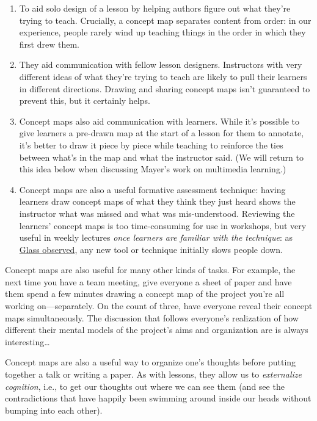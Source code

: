 \begin{enumerate}
\item To aid solo design of a lesson by helping authors figure out what they're trying to teach.
Crucially, a concept map separates content from order:
in our experience,
people rarely wind up teaching things in the order in which they first drew them.
\item They aid communication with fellow lesson designers.
Instructors with very different ideas of what they're trying to teach
are likely to pull their learners in different directions.
Drawing and sharing concept maps isn't guaranteed to prevent this,
but it certainly helps.
\item Concept maps also aid communication with learners.
While it's possible to give learners a pre-drawn map at the start of a lesson for them to annotate,
it's better to draw it piece by piece while teaching
to reinforce the ties between what's in the map and what the instructor said.
(We will return to this idea below when discussing Mayer's work on multimedia learning.)
\item Concept maps are also a useful formative assessment technique:
having learners draw concept maps of what they think they just heard shows the instructor
what was missed and what was mis-understood.
Reviewing the learners' concept maps is too time-consuming for use in workshops,
but very useful in weekly lectures
\emph{once learners are familiar with the technique}:
as \href{http://www.amazon.com/Facts-Fallacies-Software-Engineering-Robert/dp/0321117425/}{Glass observed},
any new tool or technique initially slows people down.
\end{enumerate}

Concept maps are also useful for many other kinds of tasks.
For example,
the next time you have a team meeting,
give everyone a sheet of paper
and have them spend a few minutes drawing a concept map of
the project you're all working on---separately.
On the count of three,
have everyone reveal their concept maps simultaneously.
The discussion that follows everyone's realization
of how different their mental models of the project's aims and organization are
is always interesting\ldots{}

Concept maps are also a useful way to organize one's thoughts
before putting together a talk or writing a paper.
As with lessons,
they allow us to \emph{externalize cognition},
i.e.,
to get our thoughts out where we can see them
(and see the contradictions that have happily been swimming around inside our heads
without bumping into each other).


